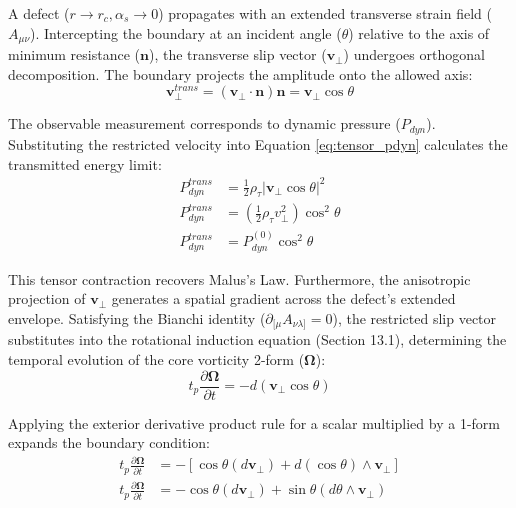 A defect ($r \to r_c, \alpha_s \to 0$) propagates with an extended transverse strain field ($A_{\mu\nu}$). Intercepting the boundary at an incident angle ($\theta$) relative to the axis of minimum resistance ($\mathbf{n}$), the transverse slip vector ($\mathbf{v}_\perp$) undergoes orthogonal decomposition. The boundary projects the amplitude onto the allowed axis: 
\begin{equation}
    \mathbf{v}_\perp^{trans} = (\mathbf{v}_\perp \cdot \mathbf{n})\mathbf{n} = \mathbf{v}_\perp \cos\theta
\end{equation}

The observable measurement corresponds to dynamic pressure ($P_{dyn}$). Substituting the restricted velocity into Equation \ref{eq:tensor_pdyn} calculates the transmitted energy limit:
\begin{align}
    P_{dyn}^{trans} &= \frac{1}{2} \rho_\tau |\mathbf{v}_\perp \cos\theta|^2 \nonumber \\
    P_{dyn}^{trans} &= \left( \frac{1}{2} \rho_\tau v_\perp^2 \right) \cos^2\theta \nonumber \\
    P_{dyn}^{trans} &= P_{dyn}^{(0)} \cos^2\theta
\end{align}

This tensor contraction recovers Malus's Law. Furthermore, the anisotropic projection of $\mathbf{v}_\perp$ generates a spatial gradient across the defect's extended envelope. Satisfying the Bianchi identity ($\partial_{[\mu} A_{\nu\lambda]} = 0$), the restricted slip vector substitutes into the rotational induction equation (Section 13.1), determining the temporal evolution of the core vorticity 2-form ($\boldsymbol{\Omega}$): %
\begin{equation}
    t_p \frac{\partial \boldsymbol{\Omega}}{\partial t} = - d \left( \mathbf{v}_\perp \cos\theta \right) \label{eq:measurement_torque}
\end{equation}

Applying the exterior derivative product rule for a scalar multiplied by a 1-form expands the boundary condition: %
\begin{align}
    t_p \frac{\partial \boldsymbol{\Omega}}{\partial t} &= - \left[ \cos\theta (d\mathbf{v}_\perp) + d(\cos\theta) \wedge \mathbf{v}_\perp \right] \nonumber \\
    t_p \frac{\partial \boldsymbol{\Omega}}{\partial t} &= - \cos\theta (d\mathbf{v}_\perp) + \sin\theta (d\theta \wedge \mathbf{v}_\perp) \label{eq:expanded_torque}
\end{align}

